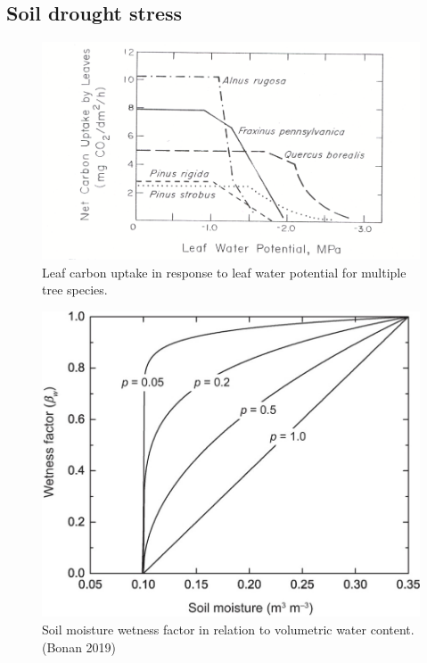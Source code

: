 \documentclass[
  oneside]{book}
\begin{document}
\hypertarget{soil-drought-stress}{%
\subsection{Soil drought stress}\label{soil-drought-stress}}

\begin{figure}

{\centering \includegraphics[width=0.8\linewidth]{figures/chap2/leafWP} 

}

\caption{Leaf carbon uptake in response to leaf water potential for multiple tree species.}\label{fig:f216}
\end{figure}

\begin{figure}

{\centering \includegraphics[width=0.8\linewidth]{figures/chap2/SWfactor} 

}

\caption{Soil moisture wetness factor in relation to volumetric water content. (Bonan 2019)}\label{fig:f217}
\end{figure}
\end{document}
